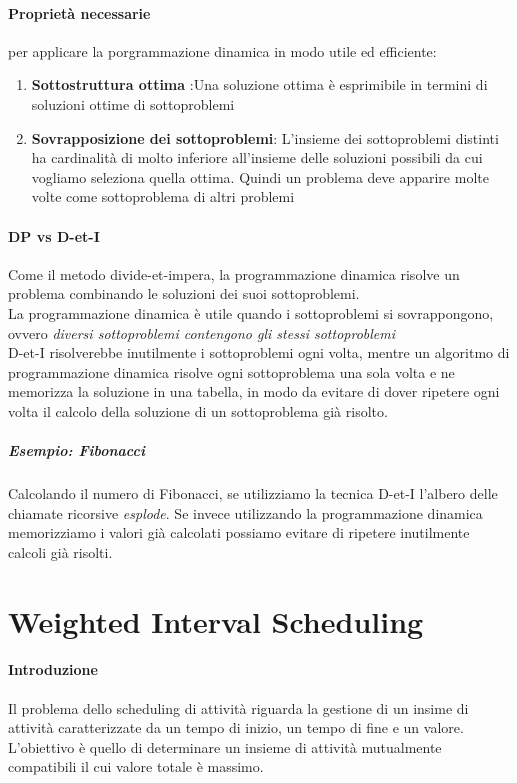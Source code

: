 \documentclass[12pt, a4paper, openany]{book}
\begin{document}
\paragraph{Proprietà necessarie} per applicare la porgrammazione dinamica in modo utile ed efficiente:
\begin{enumerate}
	\item \textbf{Sottostruttura ottima} :Una soluzione ottima è esprimibile in termini di soluzioni ottime di sottoproblemi
	\item \textbf{Sovrapposizione dei sottoproblemi}: L'insieme dei sottoproblemi distinti ha cardinalità di molto inferiore all'insieme delle soluzioni possibili da cui vogliamo seleziona quella ottima. Quindi un problema deve apparire molte volte come sottoproblema di altri problemi
\end{enumerate}

\paragraph{DP vs D-et-I}
Come il metodo divide-et-impera, la programmazione dinamica risolve un problema combinando le soluzioni dei suoi sottoproblemi.\\
La programmazione dinamica è utile quando i sottoproblemi si sovrappongono, ovvero \emph{diversi sottoproblemi contengono gli stessi sottoproblemi}\\
D-et-I risolverebbe inutilmente i sottoproblemi ogni volta, mentre un algoritmo di programmazione dinamica risolve ogni sottoproblema una sola volta e ne memorizza la soluzione in una tabella, in modo da evitare di dover ripetere ogni volta il calcolo della soluzione di un sottoproblema già risolto.
\subparagraph{Esempio: Fibonacci}
Calcolando il numero di Fibonacci, se utilizziamo la tecnica D-et-I l'albero delle chiamate ricorsive \emph{esplode}.
Se invece utilizzando la programmazione dinamica memorizziamo i valori già calcolati possiamo evitare di ripetere inutilmente calcoli già risolti.

\section{Weighted Interval Scheduling}
\paragraph{Introduzione}Il problema dello scheduling di attività riguarda la gestione di un insime di attività caratterizzate da un tempo di inizio, un tempo di fine e un valore.
L'obiettivo è quello di determinare un insieme di attività mutualmente compatibili il cui valore totale è massimo.
\end{document}
